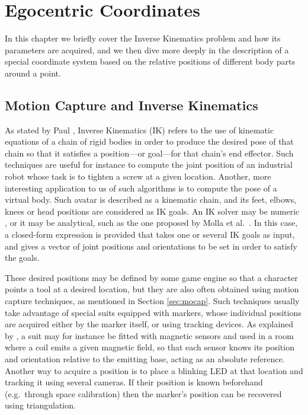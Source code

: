 
\chapter{Egocentric Coordinates}

\label{Chapter2}

In this chapter we briefly cover the Inverse Kinematics problem and how its parameters are acquired, and we then dive more deeply in the description of a special coordinate system based on the relative positions of different body parts around a point.

\section{Motion Capture and Inverse Kinematics}

As stated by Paul \cite{paul1981robot}, Inverse Kinematics (IK) refers to the use of kinematic equations of a chain of rigid bodies in order to produce the desired pose of that chain so that it satisfies a position---or goal---for that chain's end effector. Such techniques are useful for instance to compute the joint position of an industrial robot whose task is to tighten a screw at a given location. Another, more interesting application to us of such algorithms is to compute the pose of a virtual body. Such avatar is described as a kinematic chain, and its feet, elbows, knees or head positions are considered as IK goals. An IK solver may be numeric \cite{goldenberg1985complete,manocha1994efficient}, or it may be analytical, such as the one proposed by Molla et al.\ \cite{molla2013singularity}. In this case, a closed-form expression is provided that takes one or several IK goals as input, and gives a vector of joint positions and orientations to be set in order to satisfy the goals.

These desired positions may be defined by some game engine so that a character points a tool at a desired location, but they are also often obtained using motion capture techniques, as mentioned in Section \ref{sec:mocap}. Such techniques usually take advantage of special suits equipped with markers, whose individual positions are acquired either by the marker itself, or using tracking devices. As explained by \cite{west1995motion}, a suit may for instance be fitted with magnetic sensors and used in a room where a coil emits a given magnetic field, so that each sensor knows its position and orientation relative to the emitting base, acting as an absolute reference. Another way to acquire a position is to place a blinking LED at that location and tracking it using several cameras. If their position is known beforehand (e.g.\ through space calibration) then the marker's position can be recovered using triangulation.

